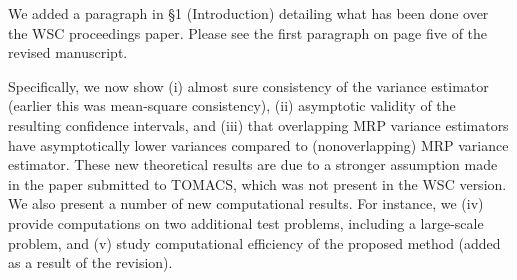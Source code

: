 \documentclass[11pt,notitlepage,onecolumn]{article}
\newcommand{\noi}{\noindent}
\begin{document}
\noindent
We added a paragraph in \S 1 (Introduction) detailing what has been done over the WSC proceedings paper. 
Please see the first paragraph on page five of the revised manuscript.\bigskip  

\noi 
Specifically, we now show (i) almost sure consistency of the variance estimator (earlier this was mean-square consistency), (ii) asymptotic validity of the resulting confidence intervals, and (iii) that overlapping MRP variance estimators have asymptotically lower variances compared to (nonoverlapping) MRP variance estimator. 
These new theoretical results are due to a stronger assumption made in the paper submitted to TOMACS, which was not present in the WSC version. 
We also present a number of new computational results. 
For instance, we (iv) provide computations on two additional test problems, including a large-scale problem, and (v) study computational efficiency of the proposed method (added as a result of the revision). 
\end{document}
